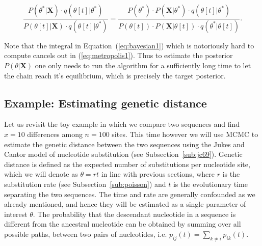\begin{equation}
\frac{P\left(\theta^{*}|\mathbf{X}\right)\cdot q\left(\theta\left[t\right]|\theta^{*}\right)}{P\left(\theta\left[t\right]|\mathbf{X}\right)\cdot q\left(\theta\left[t\right]|\theta^{*}\right)}=\frac{P(\theta^{*})\cdot P\left(\mathbf{X}|\theta^{*}\right)\cdot q\left(\theta\left[t\right]|\theta^{*}\right)}{P(\theta\left[t\right])\cdot P\left(\mathbf{X}|\theta\left[t\right]\right)\cdot q\left(\theta^{*}|\theta\left[t\right]\right)}.
\label{eq:metropolis1}
\end{equation}

Note that the integral in Equation~(\ref{eq:bayesian1}) which is notoriously hard to compute cancels out in (\ref{eq:metropolis1}).
Thus to estimate the posterior $P\left(\theta|\mathbf{X}\right)$ one only needs to run the algorithm for a sufficiently long time to let the chain reach it's equilibrium, which is precisely the target posterior.

\subsection{Example: Estimating genetic distance}


Let us revisit the toy example in which we compare two sequences and find $x=10$ differences among $n=100$ sites.
This time however we will use MCMC to estimate the genetic distance between the two sequences using the Jukes and Cantor model of nucleotide substitution (see Subsection~\ref{sub:jc69}).
Genetic distance is defined as the expected number of substitutions per nucleotide site, which we will denote as $\theta=rt$ in line with previous sections, where $r$ is the substitution rate (see Subsection~\ref{sub:poisson}) and $t$ is the evolutionary time separating the two sequences.
The time and rate are generally confounded as we already mentioned, and hence they will be estimated as a single parameter of interest $\theta$.
The probability that the descendant nucleotide in a sequence is different from the ancestral nucleotide can be obtained by summing over all possible paths, between two pairs of nucleotides, i.e. $p_{ij}(t)=\underset{k\neq i}{\sum}p_{ik}(t)$.

